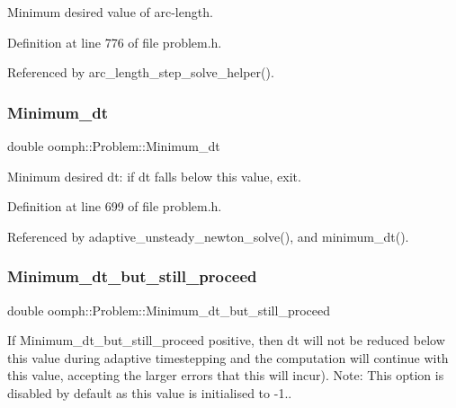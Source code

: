 Minimum desired value of arc-\/length. 



Definition at line 776 of file problem.\+h.



Referenced by arc\+\_\+length\+\_\+step\+\_\+solve\+\_\+helper().

\mbox{\label{classoomph_1_1Problem_ad7456318933aa01114dc78498bfd6d79}} 
\subsubsection{\texorpdfstring{Minimum\+\_\+dt}{Minimum\_dt}}
{\footnotesize\ttfamily double oomph\+::\+Problem\+::\+Minimum\+\_\+dt\hspace{0.3cm}{\ttfamily [protected]}}



Minimum desired dt\+: if dt falls below this value, exit. 



Definition at line 699 of file problem.\+h.



Referenced by adaptive\+\_\+unsteady\+\_\+newton\+\_\+solve(), and minimum\+\_\+dt().

\mbox{\label{classoomph_1_1Problem_abdee700b2cec37540cf1e7e1462df6c3}} 
\subsubsection{\texorpdfstring{Minimum\+\_\+dt\+\_\+but\+\_\+still\+\_\+proceed}{Minimum\_dt\_but\_still\_proceed}}
{\footnotesize\ttfamily double oomph\+::\+Problem\+::\+Minimum\+\_\+dt\+\_\+but\+\_\+still\+\_\+proceed\hspace{0.3cm}{\ttfamily [protected]}}



If Minimum\+\_\+dt\+\_\+but\+\_\+still\+\_\+proceed positive, then dt will not be reduced below this value during adaptive timestepping and the computation will continue with this value, accepting the larger errors that this will incur). Note\+: This option is disabled by default as this value is initialised to -\/1.. 



